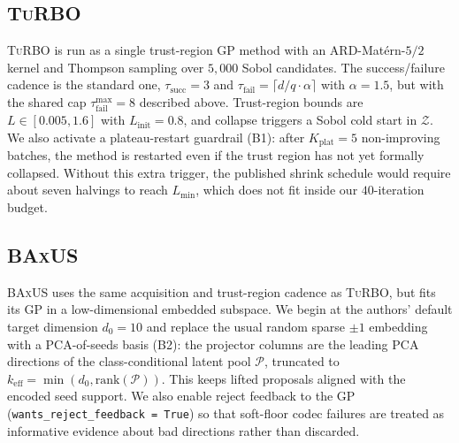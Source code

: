 \documentclass{article}
\newcommand{\turbo}{\textsc{TuRBO}}
\newcommand{\baxus}{\textsc{BAxUS}}
\newcommand{\Z}{\mathcal{Z}}
\begin{document}
\subsection{\turbo{}~\citep{eriksson2019}}

\turbo{} is run as a single trust-region GP method with an ARD-Mat\'ern-$5/2$ kernel and Thompson sampling over $5{,}000$ Sobol candidates. The success/failure cadence is the standard one, $\tau_{\mathrm{succ}}{=}3$ and $\tau_{\mathrm{fail}}{=}\lceil d/q \cdot \alpha\rceil$ with $\alpha=1.5$, but with the shared cap $\tau_{\mathrm{fail}}^{\max}{=}8$ described above. Trust-region bounds are $L\in[0.005,1.6]$ with $L_{\mathrm{init}}=0.8$, and collapse triggers a Sobol cold start in $\Z$. We also activate a plateau-restart guardrail (B1): after $K_{\mathrm{plat}}{=}5$ non-improving batches, the method is restarted even if the trust region has not yet formally collapsed. Without this extra trigger, the published shrink schedule would require about seven halvings to reach $L_{\min}$, which does not fit inside our $40$-iteration budget.

\subsection{\baxus{}~\citep{papenmeier2022}}

\baxus{} uses the same acquisition and trust-region cadence as \turbo{}, but fits its GP in a low-dimensional embedded subspace. We begin at the authors' default target dimension $d_0=10$ and replace the usual random sparse $\pm 1$ embedding with a PCA-of-seeds basis (B2): the projector columns are the leading PCA directions of the class-conditional latent pool $\mathcal P$, truncated to $k_{\mathrm{eff}}=\min(d_0,\mathrm{rank}(\mathcal P))$. This keeps lifted proposals aligned with the encoded seed support. We also enable reject feedback to the GP (\texttt{wants\_reject\_feedback = True}) so that soft-floor codec failures are treated as informative evidence about bad directions rather than discarded.
\end{document}
